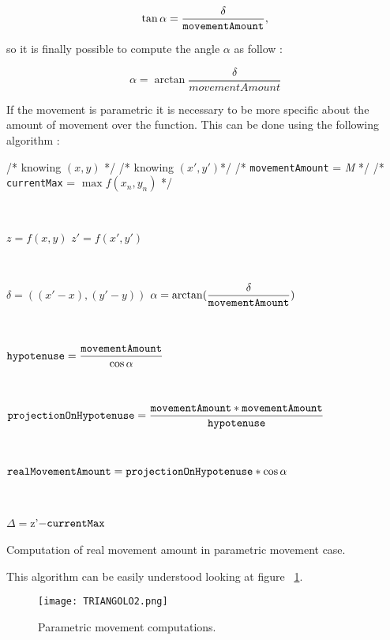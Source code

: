 \begin{equation}
	\tan \alpha = \dfrac{\delta}{\tt movementAmount},
\end{equation}

so it is finally possible to compute the angle $\alpha$ as follow :

\begin{equation}
	\alpha = \arctan \dfrac{\delta}{movementAmount}
\end{equation}

If the movement is parametric it is necessary to be more specific about the amount of movement over the function. This can be done using the following algorithm :

\begin{algorithm}
	/* knowing $(x, y)$ */ \;
	/* knowing $(x', y')$*/ \;
	/* {\tt movementAmount} = \textit{M} */ \;
	/* {\tt currentMax} = $\max f(x_n, y_n)$ */ \;
	
	
	\
	
	$z = f(x, y)$ \;
	$z' = f(x', y')$\;
	
	\
	
	$\delta = ((x'-x),  (y'-y))$ \;
	$\alpha = \arctan(\dfrac{\delta}{\tt movementAmount})$ \;
	
	\
	
	${\tt hypotenuse} = \dfrac{{\tt movementAmount}}{\cos \alpha}$ \;
	
	\
	
	${\tt projectionOnHypotenuse} = \dfrac{{\tt movementAmount} * {\tt movementAmount}}{{\tt hypotenuse}}$ \;
	
	\
	
	${\tt realMovementAmount} = {\tt projectionOnHypotenuse} * \cos \alpha$ \;
	 
	 \
	
	$\Delta = $z'$ - {\tt currentMax} $\;
	
	\caption{Computation of real movement amount in parametric movement case.} 
	\label{PMAlgo}
	
\end{algorithm}

This algorithm can be easily understood looking at figure ~\ref{fig:PMComputations}. 

\begin{figure} [h!]
	\centering
	\texttt{[image: TRIANGOLO2.png]}
	\caption{Parametric movement computations.}
	\label{fig:PMComputations}
\end{figure}

